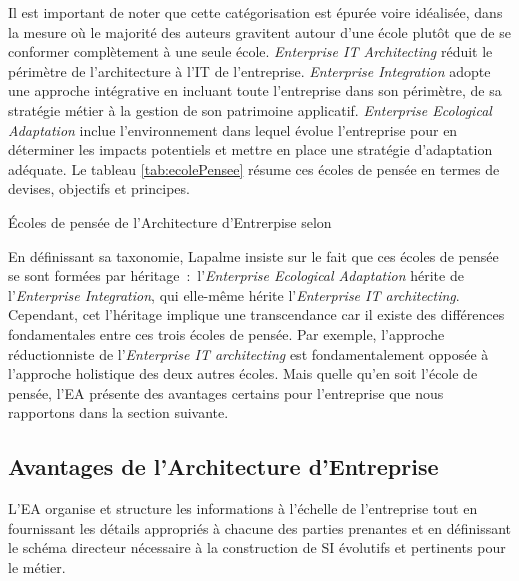 Il est important de noter que cette catégorisation est épurée voire
idéalisée, dans la mesure où le majorité des auteurs gravitent autour d'une
école plutôt que de se conformer complètement à une seule école.
\textit{Enterprise IT Architecting} réduit le périmètre de l'architecture à
l'IT de l'entreprise.  \textit{Enterprise Integration} adopte une approche
intégrative en incluant toute l'entreprise dans son périmètre, de sa stratégie
métier à la gestion de son patrimoine applicatif. \textit{Enterprise Ecological
Adaptation} inclue l'environnement dans lequel évolue l'entreprise pour en
déterminer les impacts potentiels et mettre en place une stratégie d'adaptation
adéquate. Le tableau \ref{tab:ecolePensee} résume ces écoles de pensée en
termes de devises, objectifs et principes. 

\begin{table}[!ht]
		
	\caption{Écoles de pensée de l'Architecture d'Entrerpise selon
\protect\cite{lapalme2012three}}
 	\label{tab:ecolePensee}
\end{table}

En définissant sa taxonomie, Lapalme insiste sur le fait que ces écoles de
pensée se sont formées par héritage~:~l'\textit{Enterprise Ecological
Adaptation} hérite de l'\textit{Enterprise Integration}, qui elle-même hérite
l'\textit{Enterprise IT architecting}. Cependant, cet l'héritage implique une
transcendance car il existe des différences fondamentales entre ces trois
écoles de pensée. Par exemple, l'approche réductionniste de
l'\textit{Enterprise IT architecting} est fondamentalement opposée à l'approche
holistique des deux autres écoles. Mais quelle qu'en soit l'école de pensée,
l'EA présente des avantages certains pour l'entreprise que nous rapportons dans
la section suivante. 



\subsection{Avantages de l'Architecture d'Entreprise}

L'EA organise et structure les informations à l'échelle de l'entreprise tout en
fournissant les détails appropriés à chacune des parties prenantes et en
définissant le schéma directeur nécessaire à la construction de SI évolutifs et
pertinents pour le métier. 

